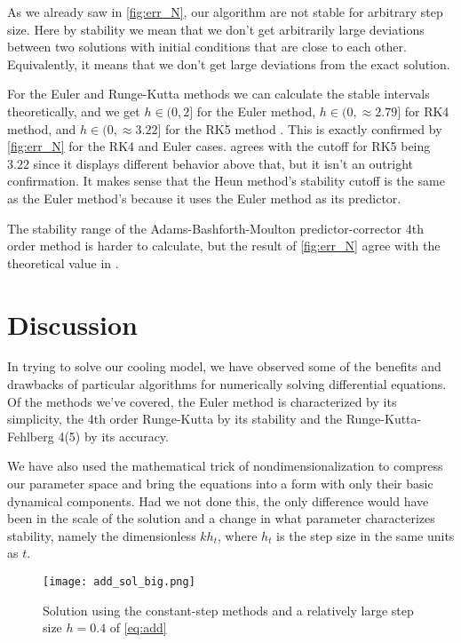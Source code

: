 \documentclass[10pt,a4paper,twocolumn]{article}
\begin{document}
As we already saw in \cref{fig:err_N}, our algorithm are not stable for arbitrary step size. Here by stability we mean that we don't get arbitrarily large deviations between two solutions with initial conditions that are close to each other. Equivalently, it means that we don't get large deviations from the exact solution.

For the Euler and Runge-Kutta methods we can calculate the stable intervals theoretically, and we get $h \in (0,2]$ for the Euler method, $h \in (0, \approx 2.79]$ for RK4 method, and $h \in (0, \approx 3.22]$ for the RK5 method \cite{rk_stab}. This is exactly confirmed by \cref{fig:err_N} for the RK4 and Euler cases.  agrees with the cutoff for RK5 being $3.22$ since it displays different behavior above that, but it isn't an outright confirmation. It makes sense that the Heun method's stability cutoff is the same as the Euler method's because it uses the Euler method as its predictor.

The stability range of the Adams-Bashforth-Moulton predictor-corrector 4th order method is harder to calculate, but the result of \cref{fig:err_N} agree with the theoretical value in \cite{10.2307/2004101}.


\section{Discussion}

In trying to solve our cooling model, we have observed some of the benefits and drawbacks of particular algorithms for numerically solving differential equations. Of the methods we've covered, the Euler method is characterized by its simplicity, the 4th order Runge-Kutta by its stability and the Runge-Kutta-Fehlberg 4(5) by its accuracy.

We have also used the mathematical trick of nondimensionalization to compress our parameter space and bring the equations into a form with only their basic dynamical components. Had we not done this, the only difference would have been in the scale of the solution and a change in what parameter characterizes stability, namely the dimensionless $k h_t$, where $h_t$ is the step size in the same units as $t$.


\begin{figure}
    \centering
    \captionsetup{justification=centering}
    \texttt{[image: add\_sol\_big.png]}
    \caption{Solution using the constant-step methods and a relatively large step size $h=0.4$ of \cref{eq:add}}
    \label{fig:add_sol_big}
\end{figure}
\end{document}

